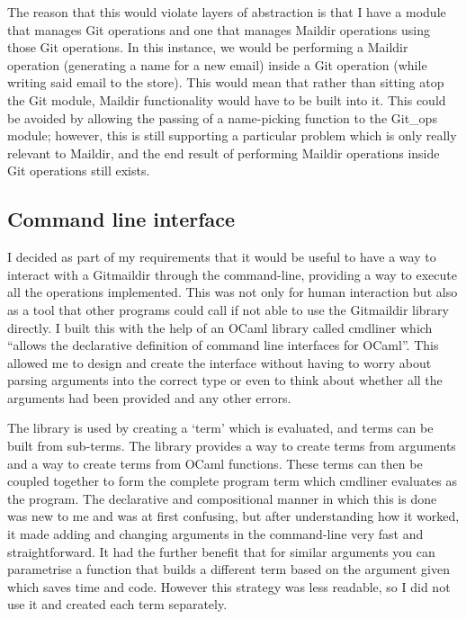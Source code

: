 The reason that this would violate layers of abstraction is that I have a module that manages Git operations and one that manages Maildir operations using those Git operations. In this instance, we would be performing a Maildir operation (generating a name for a new email) inside a Git operation (while writing said email to the store). This would mean that rather than sitting atop the Git module, Maildir functionality would have to be built into it. This could be avoided by allowing the passing of a name-picking function to the Git\_ops module; however, this is still supporting a particular problem which is only really relevant to Maildir, and the end result of performing Maildir operations inside Git operations still exists.

\subsection{Command line interface}

I decided as part of my requirements that it would be useful to have a way to interact with a Gitmaildir through the command-line, providing a way to execute all the operations implemented. This was not only for human interaction but also as a tool that other programs could call if not able to use the Gitmaildir library directly. I built this with the help of an OCaml library called cmdliner which ``allows the declarative definition of command line interfaces for OCaml''\cite{code_cmdliner}. This allowed me to design and create the interface without having to worry about parsing arguments into the correct type or even to think about whether all the arguments had been provided and any other errors.

The library is used by creating a `term' which is evaluated, and terms can be built from sub-terms. The library provides a way to create terms from arguments and a way to create terms from OCaml functions. These terms can then be coupled together to form the complete program term which cmdliner evaluates as the program. The declarative and compositional manner in which this is done was new to me and was at first confusing, but after understanding how it worked, it made adding and changing arguments in the command-line very fast and straightforward. It had the further benefit that for similar arguments you can parametrise a function that builds a different term based on the argument given which saves time and code. However this strategy was less readable, so I did not use it and created each term separately.

